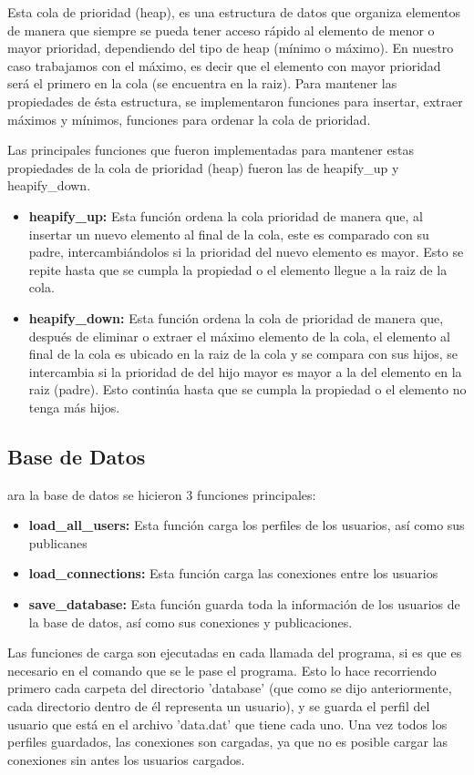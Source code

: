 \documentclass[9pt,letterpaper,onecolumn]{rho-class/rho}
\begin{document}
	\vspace{0.5cm}

	Esta cola de prioridad (heap), es una estructura de datos que organiza elementos de manera que siempre se pueda tener acceso rápido al elemento de menor o mayor prioridad, dependiendo del tipo de heap (mínimo o máximo). En nuestro caso trabajamos con el máximo, es decir que el elemento con mayor prioridad será el primero en la cola (se encuentra en la raiz). Para mantener las propiedades de ésta estructura, se implementaron funciones para insertar, extraer máximos y mínimos, funciones para ordenar la cola de prioridad.
	
	\vspace{0.5cm}

	Las principales funciones que fueron implementadas para mantener estas propiedades de la cola de prioridad (heap) fueron las de heapify\_up y heapify\_down.
	
	\begin{itemize}
		\item \textbf{heapify\_up:} Esta función ordena la cola prioridad de manera que, al insertar un nuevo elemento al final de la cola, este es comparado con su padre, intercambiándolos si la prioridad del nuevo elemento es mayor. Esto se repite hasta que se cumpla la propiedad o el elemento llegue a la raiz de la cola.
		\item \textbf{heapify\_down:} Esta función ordena la cola de prioridad de manera que, después de eliminar o extraer el máximo elemento de la cola, el elemento al final de la cola es ubicado en la raiz de la cola y se compara con sus hijos, se intercambia si la prioridad de del hijo mayor es mayor a la del elemento en la raiz (padre). Esto continúa hasta que se cumpla la propiedad o el elemento no tenga más hijos.
	\end{itemize}

\newpage
\subsection{Base de Datos}
ara la base de datos se hicieron 3 funciones principales:
	\begin{itemize}
		\item \textbf{load\_all\_users:} Esta función carga los perfiles de los usuarios, así como sus publicanes
		\item \textbf{load\_connections:} Esta función carga las conexiones entre los usuarios
		\item \textbf{save\_database:} Esta función guarda toda la información de los usuarios de la base de datos, así como sus conexiones y publicaciones.
		\
	\end{itemize}
Las funciones de carga son ejecutadas en cada llamada del programa, si es que es necesario en el comando que se le pase el programa. Esto lo hace recorriendo primero cada carpeta del directorio 'database' (que como se dijo anteriormente, cada directorio dentro de él representa un usuario), y se guarda el perfil del usuario que está en el archivo 'data.dat' que tiene cada uno. Una vez todos los perfiles guardados, las conexiones son cargadas, ya que no es posible cargar las conexiones sin antes los usuarios cargados.
\end{document}
